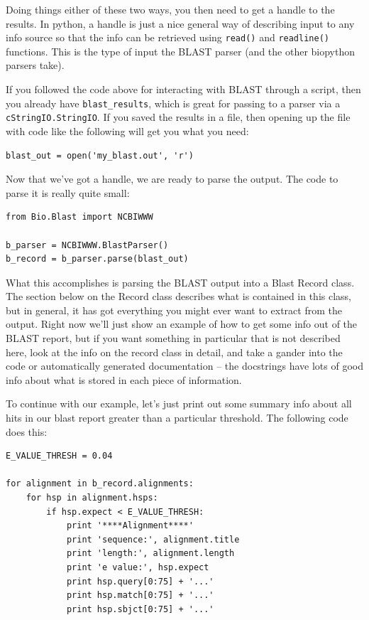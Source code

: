 \documentclass{report}
\begin{document}
Doing things either of these two ways, you then need to get a handle
to the results. In python, a handle is just a nice general way of
describing input to any info source so that the info can be retrieved
using \verb|read()| and \verb|readline()| functions. This is the type
of input the BLAST parser (and the other biopython parsers take). 


If you followed the code above for interacting with BLAST through a
script, then you already have \verb|blast_results|, which is great for
passing to a parser via a \verb|cStringIO.StringIO|. If you saved the results in a file, then opening
up the file with code like the following will get you what you need:


\begin{verbatim}
blast_out = open('my_blast.out', 'r')
\end{verbatim}


Now that we've got a handle, we are ready to parse the output. The
code to parse it is really quite small:


\begin{verbatim}
from Bio.Blast import NCBIWWW

b_parser = NCBIWWW.BlastParser()
b_record = b_parser.parse(blast_out)
\end{verbatim}

What this accomplishes is parsing the BLAST output into a Blast Record
class. The section below on the Record class describes what is
contained in this class, but in general, it has got everything you
might ever want to extract from the output. Right now we'll just show
an example of how to get some info out of the BLAST report, but if you
want something in particular that is not described here, look at the
info on the record class in detail, and take a gander into the code or
automatically generated documentation -- the docstrings have lots of
good info about what is stored in each piece of information.


To continue with our example, let's just print out some summary info
about all hits in our blast report greater than a particular
threshold. The following code does this:

\begin{verbatim}
E_VALUE_THRESH = 0.04

for alignment in b_record.alignments:
    for hsp in alignment.hsps:
        if hsp.expect < E_VALUE_THRESH:
            print '****Alignment****'
            print 'sequence:', alignment.title
            print 'length:', alignment.length
            print 'e value:', hsp.expect
            print hsp.query[0:75] + '...'
            print hsp.match[0:75] + '...'
            print hsp.sbjct[0:75] + '...'
\end{verbatim}
\end{document}
